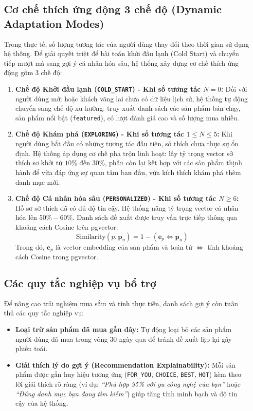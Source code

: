 \documentclass{report}
\begin{document}
\subsection{Cơ chế thích ứng động 3 chế độ (Dynamic Adaptation Modes)}
Trong thực tế, số lượng tương tác của người dùng thay đổi theo thời gian sử dụng hệ thống. Để giải quyết triệt để bài toán khởi đầu lạnh (Cold Start) và chuyển tiếp mượt mà sang gợi ý cá nhân hóa sâu, hệ thống xây dựng cơ chế thích ứng động gồm 3 chế độ:

\begin{enumerate}
    \item \textbf{Chế độ Khởi đầu lạnh (\texttt{COLD\_START}) - Khi số tương tác $N = 0$:}
    Đối với người dùng mới hoặc khách vãng lai chưa có dữ liệu lịch sử, hệ thống tự động chuyển sang chế độ xu hướng: truy xuất danh sách các sản phẩm bán chạy, sản phẩm nổi bật (\texttt{featured}), có lượt đánh giá cao và số lượng mua nhiều.
    \item \textbf{Chế độ Khám phá (\texttt{EXPLORING}) - Khi số tương tác $1 \le N \le 5$:}
    Khi người dùng bắt đầu có những tương tác đầu tiên, sở thích chưa thực sự ổn định. Hệ thống áp dụng cơ chế pha trộn linh hoạt: lấy tỷ trọng vector sở thích sơ khởi từ $10\%$ đến $30\%$, phần còn lại kết hợp với các sản phẩm thịnh hành để vừa đáp ứng sự quan tâm ban đầu, vừa kích thích khám phá thêm danh mục mới.
    \item \textbf{Chế độ Cá nhân hóa sâu (\texttt{PERSONALIZED}) - Khi số tương tác $N \ge 6$:}
    Hồ sơ sở thích đã có đủ độ tin cậy. Hệ thống nâng tỷ trọng vector cá nhân hóa lên $50\% - 60\%$. Danh sách đề xuất được truy vấn trực tiếp thông qua khoảng cách Cosine trên pgvector:
    \[
    \text{Similarity}(p, \mathbf{p}_u) = 1 - (\mathbf{e}_p \Leftrightarrow \mathbf{p}_u)
    \]
    Trong đó, $\mathbf{e}_p$ là vector embedding của sản phẩm và toán tử $\Leftrightarrow$ tính khoảng cách Cosine trong pgvector.
\end{enumerate}

\subsection{Các quy tắc nghiệp vụ bổ trợ}
Để nâng cao trải nghiệm mua sắm và tính thực tiễn, danh sách gợi ý còn tuân thủ các quy tắc nghiệp vụ:
\begin{itemize}
    \item \textbf{Loại trừ sản phẩm đã mua gần đây:} Tự động loại bỏ các sản phẩm người dùng đã mua trong vòng 30 ngày qua để tránh đề xuất lặp lại gây phiền toái.
    \item \textbf{Giải thích lý do gợi ý (Recommendation Explainability):} Mỗi sản phẩm được gắn huy hiệu tương ứng (\texttt{FOR\_YOU}, \texttt{CHOICE}, \texttt{BEST}, \texttt{HOT}) kèm theo lời giải thích rõ ràng (ví dụ: \textit{“Phù hợp 95\% với gu công nghệ của bạn”} hoặc \textit{“Đúng danh mục bạn đang tìm kiếm”}) giúp tăng tính minh bạch và độ tin cậy của hệ thống.
\end{itemize}
\end{document}
